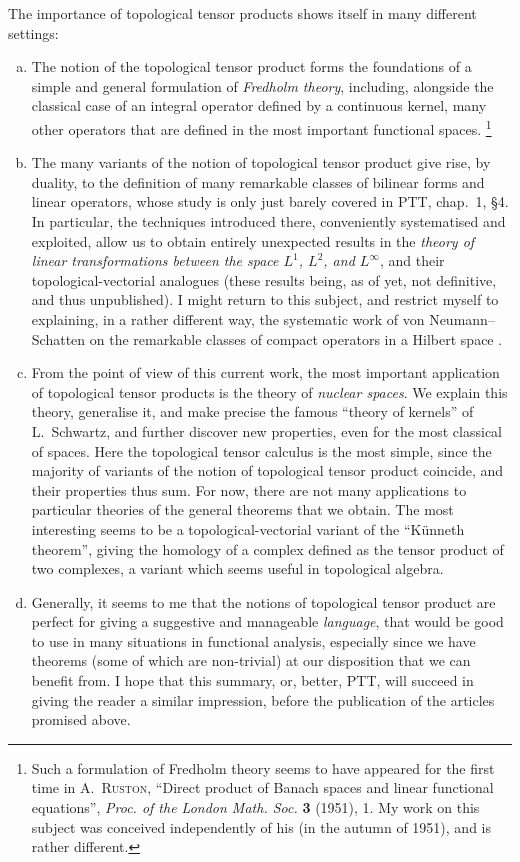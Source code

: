 \documentclass{article}
\theoremstyle{plain}
\theoremstyle{definition}
\newcommand{\oldpage}[1]{\marginpar{\footnotesize$\Big\vert$ \textit{p.~#1}}}
\begin{document}
The importance of topological tensor products shows itself in many different settings:
\begin{enumerate}[a)]
  \item The notion of the topological tensor product forms the foundations of a simple and general formulation of \emph{Fredholm theory}, including, alongside the classical case of an integral operator defined by a continuous kernel, many other operators that are defined in the most important functional spaces.%
    \footnote{Such a formulation of Fredholm theory seems to have appeared for the first time in \textsc{A.~Ruston}, ``Direct product of Banach spaces and linear functional equations'', \emph{Proc. of the London Math. Soc.} \textbf{3} (1951), 1. My work on this subject was conceived independently of his (in the autumn of 1951), and is rather different.}
  \item The many variants of the notion of topological tensor product give rise, by duality, to the definition of many remarkable classes of bilinear forms and linear operators, whose
\oldpage{74}
    study is only just barely covered in PTT, chap.~1, §4.
    In particular, the techniques introduced there, conveniently systematised and exploited, allow us to obtain entirely unexpected results in the \emph{theory of linear transformations between the space $L^1$, $L^2$, and $L^\infty$}, and their topological-vectorial analogues (these results being, as of yet, not definitive, and thus unpublished).
    I might return to this subject, and restrict myself to explaining, in a rather different way, the systematic work of von Neumann--Schatten on the remarkable classes of compact operators in a Hilbert space \cite[chap.~4]{8}.
  \item From the point of view of this current work, the most important application of topological tensor products is the theory of \emph{nuclear spaces}.
    We explain this theory, generalise it, and make precise the famous ``theory of kernels'' of L.~Schwartz, and further discover new properties, even for the most classical of spaces.
    Here the topological tensor calculus is the most simple, since the majority of variants of the notion of topological tensor product coincide, and their properties thus sum.
    For now, there are not many applications to particular theories of the general theorems that we obtain.
    The most interesting seems to be a topological-vectorial variant of the ``K\"{u}nneth theorem'', giving the homology of a complex defined as the tensor product of two complexes, a variant which seems useful in topological algebra.
  \item Generally, it seems to me that the notions of topological tensor product are perfect for giving a suggestive and manageable \emph{language}, that would be good to use in many situations in functional analysis, especially since we have theorems (some of which are non-trivial) at our disposition that we can benefit from.
  I hope that this summary, or, better, PTT, will succeed in giving the reader a similar impression, before the publication of the articles promised above.
\end{enumerate}
\end{document}
